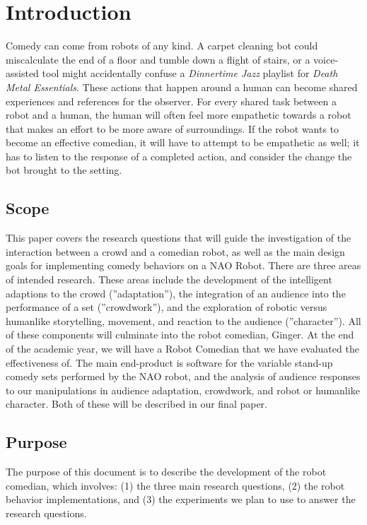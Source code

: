 \documentclass[onecolumn, draftclsnofoot,10pt, compsoc]{IEEEtran}
\begin{document}
\section{Introduction}

  Comedy can come from robots of any kind. A carpet cleaning bot could miscalculate the end of a floor and tumble down a flight of stairs, or a voice-assisted tool might accidentally confuse a \textit{Dinnertime Jazz} playlist for \textit{Death Metal Essentials}. These actions that happen around a human can become shared experiences and references for the observer. For every shared task between a robot and a human, the human will often feel more empathetic towards a robot that makes an effort to be more aware of surroundings\cite{DesignExBeh:2017}. If the robot wants to become an effective comedian, it will have to attempt to be empathetic as well; it has to listen to the response of a completed action, and consider the change the bot brought to the setting.

\subsection{Scope}
This paper covers the research questions that will guide the investigation of the interaction between a crowd and
a comedian robot, as well as the main design goals for implementing comedy behaviors on a NAO Robot. There
are three areas of intended research. These areas include the development of the intelligent adaptions to the crowd
(”adaptation”), the integration of an audience into the performance of a set (”crowdwork”), and the exploration of
robotic versus humanlike storytelling, movement, and reaction to the audience (”character”). All of these components
will culminate into the robot comedian, Ginger. At the end of the academic year, we will have a Robot Comedian that we
have evaluated the effectiveness of. The main end-product is software for the variable stand-up comedy sets performed
by the NAO robot, and the analysis of audience responses to our manipulations in audience adaptation, crowdwork,
and robot or humanlike character. Both of these will be described in our final paper.


  \subsection{Purpose}
	The purpose of this document is to describe the development of the robot comedian, which involves: (1) the three
main research questions, (2) the robot behavior implementations, and (3) the experiments we plan to use to answer the
research questions.
\end{document}
